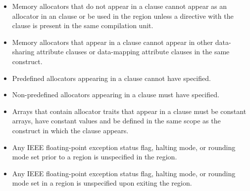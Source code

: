 \begin{itemize}
\item Memory allocators that do not appear in a  clause 
      cannot appear as an allocator in an  clause or be used in 
      the  region unless a  directive with the 
       clause is present in the same compilation unit.
\item Memory allocators that appear in a  clause cannot 
      appear in other data-sharing attribute clauses or data-mapping attribute 
      clauses in the same construct.
\item Predefined allocators appearing in a  clause cannot 
      have  specified.
\item Non-predefined allocators appearing in a  clause must 
      have  specified.
\item Arrays that contain allocator traits that appear in a  
      clause must be constant arrays, have constant values and be defined in the 
      same scope as the construct in which the clause appears. 
\item Any IEEE floating-point exception status flag, halting mode, or rounding mode 
      set prior to a  region is unspecified in the region.
\item Any IEEE floating-point exception status flag, halting mode, or rounding mode 
      set in a  region is unspecified upon exiting the region.





\end{itemize}
